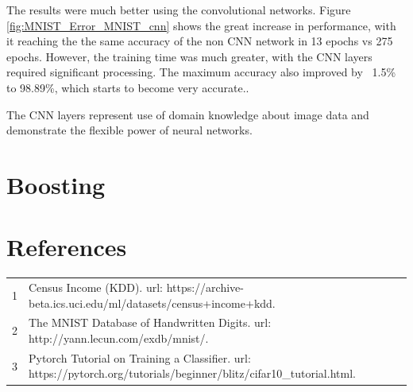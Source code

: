 \documentclass[letterpaper]{article} %
\begin{document}
The results were much better using the convolutional networks.  Figure \ref{fig:MNIST_Error_MNIST_cnn} shows the great increase in performance, with it reaching the the same accuracy of the non CNN network in 13 epochs vs 275 epochs.  However, the training time was much greater, with the CNN layers required significant processing. The maximum accuracy also improved by ~1.5\% to 98.89\%, which starts to become very accurate.. 

The CNN layers represent use of domain knowledge about image data and demonstrate the flexible power of neural networks.  

\section{Boosting}



\section{References}
\begin{tabular}{l p{2.75in}}
\\
1 & Census Income (KDD). url: https://archive-beta.ics.uci.edu/ml/datasets/census+income+kdd.
\\
2 & The MNIST Database of Handwritten Digits. url: http://yann.lecun.com/exdb/mnist/.
\\
3 & Pytorch Tutorial on Training a Classifier. url: https://pytorch.org/tutorials/beginner/blitz/cifar10\_tutorial.html.
\end{tabular}
\end{document}
